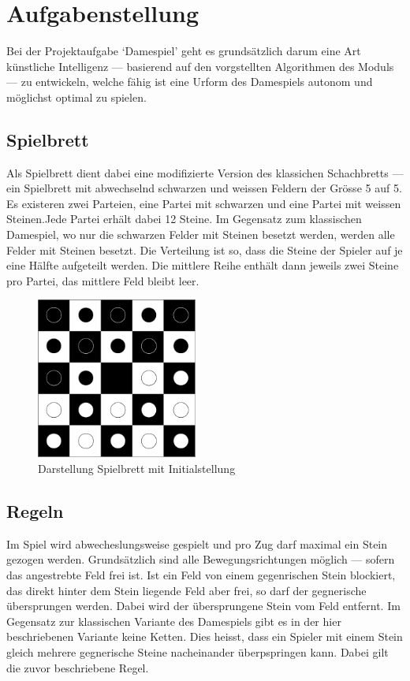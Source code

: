 \section{Aufgabenstellung}
\label{chap:basics}
Bei der Projektaufgabe `Damespiel' geht es grundsätzlich darum eine Art künstliche Intelligenz --- basierend auf den vorgstellten Algorithmen des Moduls --- zu entwickeln, welche fähig ist eine Urform des Damespiels autonom und möglichst optimal zu spielen.

\subsection{Spielbrett}
\label{sec:board}
Als Spielbrett dient dabei eine modifizierte Version des klassichen Schachbretts --- ein Spielbrett mit abwechselnd schwarzen und weissen Feldern der Grösse 5 auf 5. Es existeren zwei Parteien, eine Partei mit schwarzen und eine Partei mit weissen Steinen.Jede Partei erhält dabei 12 Steine. Im Gegensatz zum klassischen Damespiel, wo nur die schwarzen Felder mit Steinen besetzt werden, werden alle Felder mit Steinen besetzt. Die Verteilung ist so, dass die Steine der Spieler auf je eine Hälfte aufgeteilt werden. Die mittlere Reihe enthält dann jeweils zwei Steine pro Partei, das mittlere Feld bleibt leer.

\begin{figure}[h]
\centering
\includegraphics[width=200px]{images/checkers_board.png}
\caption[width=100px]{Darstellung Spielbrett mit Initialstellung\protect\footnotemark}
\label{fig:checkersBoardInitial}
\end{figure}

\subsection{Regeln}
\label{sec:rules}
Im Spiel wird abwecheslungsweise gespielt und pro Zug darf maximal ein Stein gezogen werden. Grundsätzlich sind alle Bewegungsrichtungen möglich --- sofern das angestrebte Feld frei ist. Ist ein Feld von einem gegenrischen Stein blockiert, das direkt hinter dem Stein liegende Feld aber frei, so darf der gegnerische übersprungen werden. Dabei wird der übersprungene Stein vom Feld entfernt. Im Gegensatz zur klassischen Variante des Damespiels gibt es in der hier beschriebenen Variante keine Ketten. Dies heisst, dass ein Spieler mit einem Stein gleich mehrere gegnerische Steine nacheinander überpspringen kann. Dabei gilt die zuvor beschriebene Regel.

